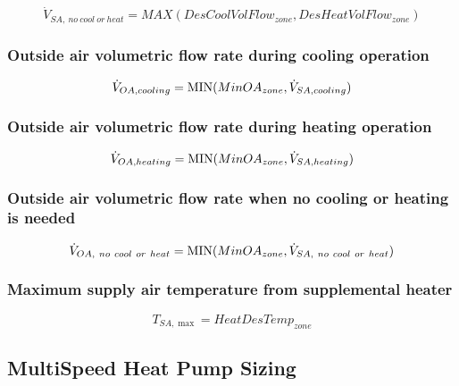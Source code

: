 \begin{equation}
\dot V_{SA,~no~cool~or~heat}  = MAX(DesCoolVolFlow_{zone},DesHeatVolFlow_{zone})
\end{equation}

\subsubsection{Outside air volumetric flow rate during cooling operation}\label{outside-air-volumetric-flow-rate-during-cooling-operation}

\begin{equation}
\dot V_{OA,cooling} = {\rm{MIN}}(MinO{A_{zone}},\dot V_{SA,cooling})
\end{equation}

\subsubsection{Outside air volumetric flow rate during heating operation}\label{outside-air-volumetric-flow-rate-during-heating-operation}

\begin{equation}
\dot V_{OA,heating} = {\rm{MIN}}(MinO{A_{zone}},\dot V_{SA,heating})
\end{equation}

\subsubsection{Outside air volumetric flow rate when no cooling or heating is needed}\label{outside-air-volumetric-flow-rate-when-no-cooling-or-heating-is-needed}

\begin{equation}
\dot V_{OA,~no~cool~or~heat} = {\rm{MIN}}(MinO{A_{zone}},\dot V_{SA,~no~cool~or~heat})
\end{equation}

\subsubsection{Maximum supply air temperature from supplemental heater}\label{maximum-supply-air-temperature-from-supplemental-heater}

\begin{equation}
{T_{SA,\max }} = HeatDesTem{p_{zone}}
\end{equation}

\subsection{MultiSpeed Heat Pump Sizing}\label{multispeed-heat-pump-sizing}

